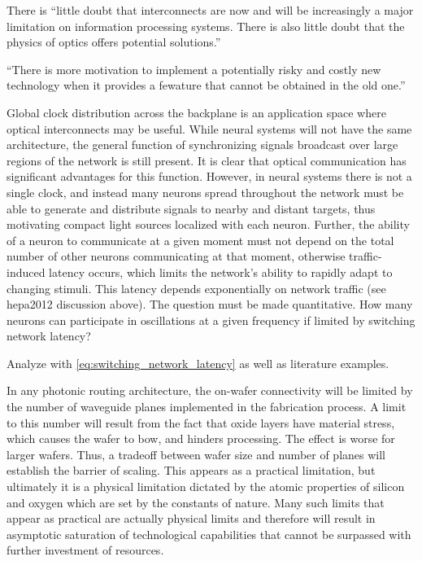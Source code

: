 \vspace{3em}
There is ``little doubt that interconnects are now and will be increasingly a major limitation on information processing systems. There is also little doubt that the physics of optics offers potential solutions.'' \cite{mi2009}

\vspace{3em}
``There is more motivation to implement a potentially risky and costly new technology when it provides a fewature that cannot be obtained in the old one.'' \cite{husz2003}

Global clock distribution across the backplane is an application space where optical interconnects may be useful. While neural systems will not have the same architecture, the general function of synchronizing signals broadcast over large regions of the network is still present. It is clear that optical communication has significant advantages for this function. However, in neural systems there is not a single clock, and instead many neurons spread throughout the network must be able to generate and distribute signals to nearby and distant targets, thus motivating compact light sources localized with each neuron. Further, the ability of a neuron to communicate at a given moment must not depend on the total number of other neurons communicating at that moment, otherwise traffic-induced latency occurs, which limits the network's ability to rapidly adapt to changing stimuli. This latency depends exponentially on network traffic (see hepa2012 discussion above). The question must be made quantitative. How many neurons can participate in oscillations at a given frequency if limited by switching network latency?

Analyze with \ref{eq:switching_network_latency} as well as literature examples. 

\vspace{3em}
\cite{walo2018}

\vspace{3em}
In any photonic routing architecture, the on-wafer connectivity will be limited by the number of waveguide planes implemented in the fabrication process. A limit to this number will result from the fact that oxide layers have material stress, which causes the wafer to bow, and hinders processing. The effect is worse for larger wafers. Thus, a tradeoff between wafer size and number of planes will establish the barrier of scaling. This appears as a practical limitation, but ultimately it is a physical limitation dictated by the atomic properties of silicon and oxygen which are set by the constants of nature. Many such limits that appear as practical are actually physical limits and therefore will result in asymptotic saturation of technological capabilities that cannot be surpassed with further investment of resources.

